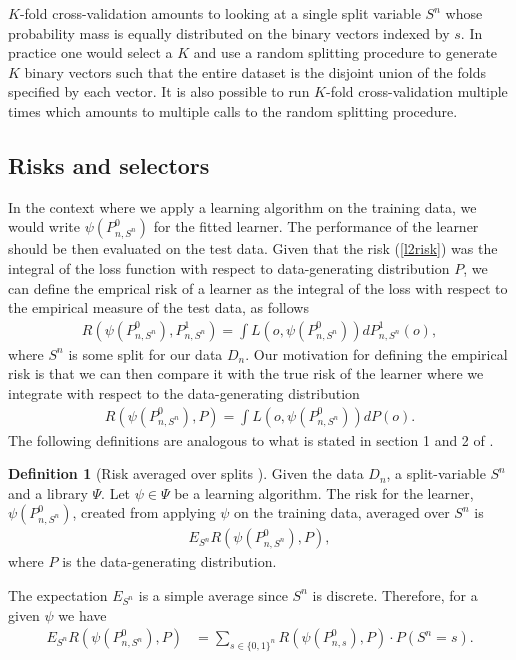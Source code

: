 \documentclass[11pt, a4paper]{article}
\theoremstyle{definition}
\newtheorem{definition}[theorem]{Definition}
\theoremstyle{remark}
\newcommand{\la}{\psi}
\newcommand{\Sn}{S^n}
\newcommand{\lib}{\Psi}
\begin{document}
$ K $-fold cross-validation amounts to looking at a single split variable $ \Sn $ whose probability mass is equally distributed on the binary vectors indexed by $ s $. In practice one would select a $ K $ and use a random splitting procedure to generate $ K $ binary vectors such that the entire dataset is the disjoint union of the folds specified by each vector. It is also possible to run $ K $-fold cross-validation multiple times which amounts to multiple calls to the random splitting procedure.
\subsection{Risks and selectors}
In the context where we apply a learning algorithm on the training data, we would write $ \la(P_{n, S^{n}}^{0}) $ for the fitted learner. The performance of the learner should be then evaluated on the test data. Given that the risk (\ref{l2risk}) was the integral of the loss function with respect to data-generating distribution $P$, we can define the emprical risk of a learner as the integral of the loss with respect to the empirical measure of the test data, as follows
 \begin{align*}
     R(\la(P_{n, S^{n}}^{0}), P_{n, \Sn}^{1}) =  \int L(o, \la(P_{n, S^{n}}^{0})) d P_{n,\Sn}^{1}(o),
 \end{align*}
where $\Sn$ is some split for our data $D_n$. Our motivation for defining the empirical risk is that we can then compare it with the true risk of the learner where we integrate with respect to the data-generating distribution 
\begin{align*}
     R(\la(P_{n, S^{n}}^{0}), P) =  \int L(o, \la(P_{n, S^{n}}^{0})) d P(o).
\end{align*}
The following definitions are analogous to what is stated in section 1 and 2 of  \parencite{laan03}.
 \begin{definition}[Risk averaged over splits \parencite{vaart06}]
     Given the data $D_n$, a split-variable $\Sn$ and a library $ \lib $. Let $ \la \in \lib $ be a learning algorithm. The risk for the learner, $\la(P_{n,\Sn}^0)$, created from applying $ \la $ on the training data, averaged over $ \Sn $ is  
    \begin{align*}
        E_{\Sn} R( \la(P_{n,\Sn}^{0}), P),
    \end{align*}
    where $ P $ is the data-generating distribution.
\end{definition}
The expectation $ E_{\Sn} $ is a simple average since $ \Sn $ is discrete. Therefore, for a given $ \la $ we have 
\begin{align*}
    E_{\Sn} R( \la(P_{n,\Sn}^{0}), P) &= \sum_{s \in \{0,1\}^{n}} R(\la(P_{n, s}^{0}), P) \cdot P(\Sn = s). 
\end{align*}
\end{document}
